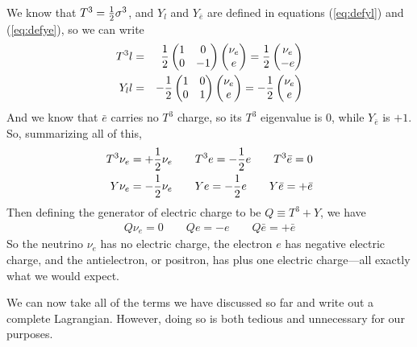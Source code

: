 \documentclass[12pt,epsf]{article}
\def\nolabel{\nonumber }
\def\nolabel{\nonumber }
\begin{document}
We know that $T^3 = {1\over 2}\sigma^3$, and $Y_l$ and $Y_{\bar e}$ are
defined in equations (\ref{eq:defyl}) and (\ref{eq:defye}), so we can
write 
\begin{eqnarray}
T^3l &=& {1\over 2}
\begin{pmatrix}
1 & 0 \\ 0 & -1
\end{pmatrix}
\begin{pmatrix}
\nu_e \\ e
\end{pmatrix} = {1\over 2}
\begin{pmatrix}
\nu_e \\ -e
\end{pmatrix}\nolabel \\
Y_ll &=& -{1\over 2}
\begin{pmatrix}
1 & 0 \\ 0 & 1
\end{pmatrix}
\begin{pmatrix}
\nu_e \\ e
\end{pmatrix} = -{1\over 2}
\begin{pmatrix}
\nu_e \\ e
\end{pmatrix}\nolabel
\end{eqnarray}
And we know that $\bar e$ carries no $T^3$ charge, so its $T^3$
eigenvalue is 0, while $Y_{\bar e}$ is $+1$.	So, summarizing all of
this, 
\begin{eqnarray}
T^3\nu_e = +{1\over 2}\nu_e \qquad T^3 e = -{1\over 2}e \qquad T^3\bar
e = 0\nolabel \\
Y\nu_e = -{1\over 2}\nu_e \qquad Ye = -{1\over 2}e \qquad Y \bar e =
+\bar e\nolabel
\end{eqnarray}
Then defining the generator of electric charge to be $Q\equiv T^3+Y$,
we have 
\begin{eqnarray}
Q\nu_e = 0 \qquad Qe = -e \qquad Q\bar e = + \bar e\nolabel
\end{eqnarray}
So the neutrino $\nu_e$ has no electric charge, the electron $e$ has
negative electric charge, and the antielectron, or positron, has plus
one electric charge---all exactly what we would expect.  

We can now take all of the terms we have discussed so far and write out
a complete Lagrangian.	However, doing so is both tedious and
unnecessary for our purposes.  
\end{document}
